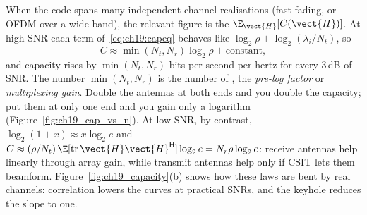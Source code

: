 When the code spans many independent channel realisations (fast fading, or OFDM over a wide band),
the relevant figure is the  $\E_{\vect{H}}[C(\vect{H})]$. At high SNR each
term of~\eqref{eq:ch19:capeq} behaves like $\log_2\rho+\log_2(\lambda_i/N_t)$, so
\begin{equation}
C\approx\min(N_t,N_r)\log_2\rho+\text{constant},
\label{eq:ch19:slope}
\end{equation}
and capacity rises by $\min(N_t,N_r)$ bits per second per hertz for every 3\,dB of SNR. The
number $\min(N_t,N_r)$ is the number of , the \emph{pre-log
factor} or \emph{multiplexing gain}. Double the antennas at both ends and you double the capacity;
put them at only one end and you gain only a logarithm (Figure~\ref{fig:ch19_cap_vs_n}). At low
SNR, by contrast, $\log_2(1+x)\approx x\log_2e$ and
$C\approx(\rho/N_t)\,\E[\operatorname{tr}\vect{H}\vect{H}^{\mathsf H}]\log_2e=N_r\rho\log_2e$: receive
antennas help linearly through array gain, while transmit antennas help only if CSIT lets them
beamform. Figure~\ref{fig:ch19_capacity}(b) shows how these laws are bent by real channels:
correlation lowers the curves at practical SNRs, and the keyhole reduces the slope to one.


